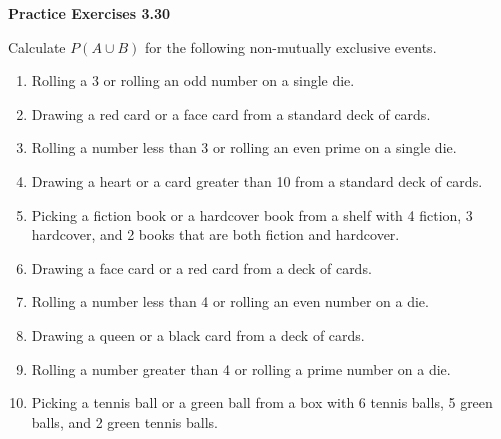 \vspace{0.3ex}
\noindent\textbf{Practice Exercises 3.30}

\vspace{0.2ex}

Calculate \( P(A \cup B) \) for the following non-mutually exclusive events. 

\begin{enumerate}[label=\color{blue}\arabic*.]
    \item Rolling a 3 or rolling an odd number on a single die.
    \item Drawing a red card or a face card from a standard deck of cards.
    \item Rolling a number less than 3 or rolling an even prime on a single die.
    \item Drawing a heart or a card greater than 10 from a standard deck of cards.
    \item Picking a fiction book or a hardcover book from a shelf with 4 fiction, 3 hardcover, and 2 books that are both fiction and hardcover.
    \item Drawing a face card or a red card from a deck of cards.
    \item Rolling a number less than 4 or rolling an even number on a die.
    \item Drawing a queen or a black card from a deck of cards.
    \item Rolling a number greater than 4 or rolling a prime number on a die.
    \item Picking a tennis ball or a green ball from a box with 6 tennis balls, 5 green balls, and 2 green tennis balls.
\end{enumerate}
